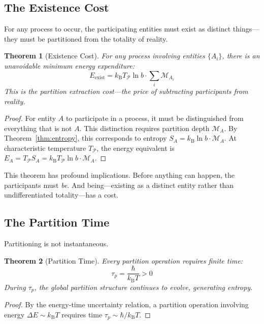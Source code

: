 \documentclass[twocolumn,10pt,a4paper]{article}
\newtheorem{theorem}{Theorem}[section]
\theoremstyle{definition}
\theoremstyle{remark}
\newcommand{\kB}{k_{\mathrm{B}}}
\newcommand{\Depth}{\mathcal{M}}
\newcommand{\Part}{\mathcal{P}}
\begin{document}
\subsection{The Existence Cost}

For any process to occur, the participating entities must exist as distinct things---they must be partitioned from the totality of reality.

\begin{theorem}[Existence Cost]
\label{thm:existence}
For any process involving entities $\{A_i\}$, there is an unavoidable minimum energy expenditure:
\begin{equation}
    E_{\mathrm{exist}} = \kB T_{\Part} \ln b \cdot \sum_i \Depth_{A_i}
\end{equation}
This is the partition extraction cost---the price of subtracting participants from reality.
\end{theorem}

\begin{proof}
For entity $A$ to participate in a process, it must be distinguished from everything that is not $A$. This distinction requires partition depth $\Depth_A$. By Theorem~\ref{thm:entropy}, this corresponds to entropy $S_A = \kB \ln b \cdot \Depth_A$. At characteristic temperature $T_{\Part}$, the energy equivalent is $E_A = T_{\Part} S_A = \kB T_{\Part} \ln b \cdot \Depth_A$.
\end{proof}

This theorem has profound implications. Before anything can happen, the participants must \emph{be}. And being---existing as a distinct entity rather than undifferentiated totality---has a cost.

\subsection{The Partition Time}

Partitioning is not instantaneous.

\begin{theorem}[Partition Time]
\label{thm:time}
Every partition operation requires finite time:
\begin{equation}
    \tau_p = \frac{\hbar}{\kB T} > 0
\end{equation}
During $\tau_p$, the global partition structure continues to evolve, generating entropy.
\end{theorem}

\begin{proof}
By the energy-time uncertainty relation, a partition operation involving energy $\Delta E \sim \kB T$ requires time $\tau_p \sim \hbar/\kB T$.
\end{proof}
\end{document}
